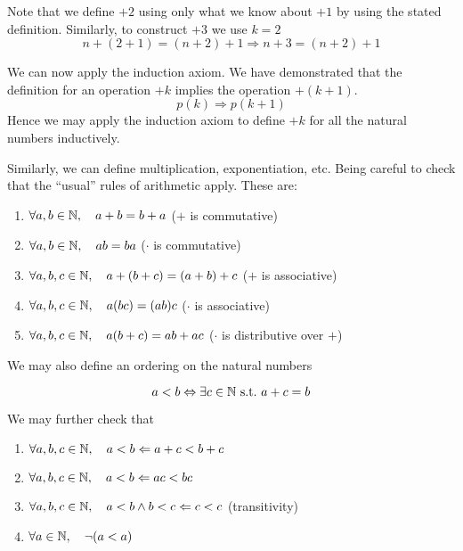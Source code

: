 \documentclass{article}
\begin{document}
Note that we define $+2$ using only what we know about $+1$ by using the stated definition. Similarly, to construct $+3$ we use $k = 2$
\[
    n + (2 + 1) = (n + 2) + 1 \Rightarrow n + 3 = (n + 2) + 1
\]

We can now apply the induction axiom. We have demonstrated that the definition for an operation $+k$ implies the operation $+(k + 1)$.
\[
    p(k) \Rightarrow p(k + 1)
\]
Hence we may apply the induction axiom to define $+k$ for all the natural numbers inductively.


Similarly, we can define multiplication, exponentiation, etc. Being careful to check that the ``usual'' rules of arithmetic apply. These are:
\begin{enumerate}[label=(\arabic*)]
    \item $\forall a, b \in \mathbb{N}, \quad a + b = b + a$ \hspace*{\fill}($+$ is commutative)
    \item $\forall a, b \in \mathbb{N}, \quad ab = ba$ \hspace*{\fill}($\cdot$ is commutative)
    \item $\forall a, b, c \in \mathbb{N}, \quad a + (b + c) = (a + b) + c$ \hspace*{\fill}($+$ is associative)
    \item $\forall a, b, c \in \mathbb{N}, \quad a(bc) = (ab)c$ \hspace*{\fill}($\cdot$ is associative)
    \item $\forall a, b, c \in \mathbb{N}, \quad a(b + c) = ab + ac$ \hspace*{\fill}($\cdot$ is distributive over $+$)
\end{enumerate}

We may also define an ordering on the natural numbers
\begin{defi}
    \[
        a < b \Leftrightarrow \exists c \in \mathbb{N} \ \text{s.t.} \ a + c = b  
    \]
\end{defi}
We may further check that
\begin{enumerate}[resume, label=(\arabic*)]
    \item $\forall a, b, c \in \mathbb{N}, \quad a < b \Leftarrow a + c < b + c$
    \item $\forall a, b, c \in \mathbb{N}, \quad a < b \Leftarrow ac < bc$
    \item $\forall a, b, c \in \mathbb{N}, \quad a < b \wedge b < c \Leftarrow c < c$ \hspace*{\fill}(transitivity)
    \item $\forall a \in \mathbb{N}, \quad \neg(a < a)$
\end{enumerate}
\end{document}
